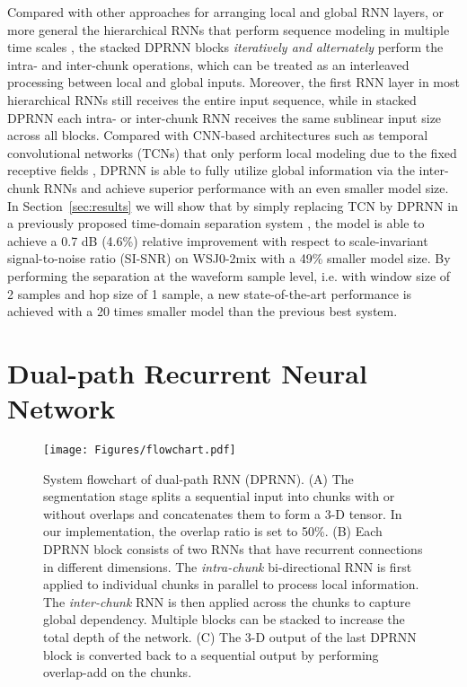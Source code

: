 \documentclass{article}
\begin{document}
Compared with other approaches for arranging local and global RNN layers, or more general the hierarchical RNNs that perform sequence modeling in multiple time scales \cite{li2015hierarchical, chung2016hierarchical, mehri2016samplernn, ishiwatari2017chunk, zhou2017chunk, chang2017dilated}, the stacked DPRNN blocks \textit{iteratively and alternately} perform the intra- and inter-chunk operations, which can be treated as an interleaved processing between local and global inputs. Moreover, the first RNN layer in most hierarchical RNNs still receives the entire input sequence, while in stacked DPRNN each intra- or inter-chunk RNN receives the same sublinear input size across all blocks. Compared with CNN-based architectures such as temporal convolutional networks (TCNs) that only perform local modeling due to the fixed receptive fields \cite{luo2019conv, shi2019furcanext, liu2019divide}, DPRNN is able to fully utilize global information via the inter-chunk RNNs and achieve superior performance with an even smaller model size. In Section~\ref{sec:results} we will show that by simply replacing TCN by DPRNN in a previously proposed time-domain separation system \cite{luo2019conv}, the model is able to achieve a 0.7 dB (4.6\%) relative improvement with respect to scale-invariant signal-to-noise ratio (SI-SNR)  \cite{le2019sdr} on WSJ0-2mix with a 49\% smaller model size. By performing the separation at the waveform sample level, i.e. with window size of 2 samples and hop size of 1 sample, a new state-of-the-art performance is achieved with a 20 times smaller model than the previous best system.
\iffalse
The rest of the paper is organized as follows. We propose the DPRNN architecture in Section~\ref{sec:model}, introduce the experiment configurations in Section~\ref{sec:exp}, analyze and discuss the experiment results in Section~\ref{sec:results}, and conclude the paper in Section~\ref{sec:conclusion}.
\fi 
\section{Dual-path Recurrent Neural Network}
\label{sec:model}
\begin{figure*}[ht]
	\small
	\centering
	\texttt{[image: Figures/flowchart.pdf]}
	\caption{System flowchart of dual-path RNN (DPRNN). (A) The segmentation stage splits a sequential input into chunks with or without overlaps and concatenates them to form a 3-D tensor. In our implementation, the overlap ratio is set to 50\%. (B) Each DPRNN block consists of two RNNs that have recurrent connections in different dimensions. The \textit{intra-chunk} bi-directional RNN is first applied to individual chunks in parallel to process local information. The \textit{inter-chunk} RNN is then applied across the chunks to capture global dependency. Multiple blocks can be stacked to increase the total depth of the network. (C) The 3-D output of the last DPRNN block is converted back to a sequential output by performing overlap-add on the chunks.}
	\label{fig:flowchart}
\end{figure*}
\end{document}
